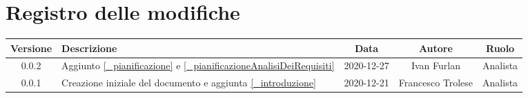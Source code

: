 \section*{Registro delle modifiche}

\begin{center}
	\begin{longtable}{|c|p{5cm}|c|c|c|}
		\hline
		\rowcolor{lighter-grayer}
		\textbf{Versione} & \textbf{Descrizione} & \textbf{Data} & \textbf{Autore} & \textbf{Ruolo} \\
		\hline
		\endfirsthead


		\hline
		0.0.2 & Aggiunto \ref{_pianificazione} e \ref{_pianificazioneAnalisiDeiRequisiti} & 2020-12-27 & Ivan Furlan & Analista\\
		\hline
		0.0.1 & Creazione iniziale del documento e aggiunta \ref{_introduzione} & 2020-12-21 & Francesco Trolese & Analista\\
		\hline
	\end{longtable}
\end{center}